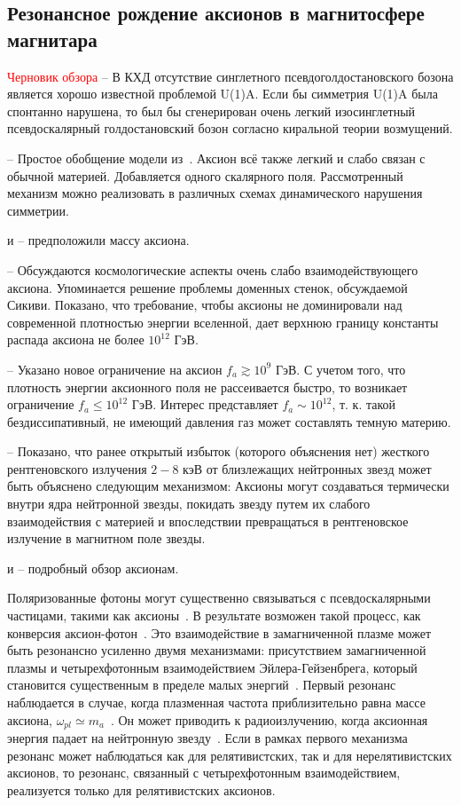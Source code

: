 \subsection{Резонансное рождение аксионов в магнитосфере магнитара}
\textcolor{red}{Черновик обзора}
\cite{Weinberg:1975} -- В КХД отсутствие синглетного псевдоголдостановского 
бозона является хорошо известной проблемой U(1)A. Если бы симметрия U(1)A была 
спонтанно нарушена, то был бы сгенерирован очень легкий изосинглетный 
псевдоскалярный голдостановский бозон согласно киральной теории возмущений.

\cite{Dine:1981} -- Простое обобщение модели из~\cite{Quinn:1977}. Аксион всё также легкий и слабо связан с обычной материей. Добавляется одного скалярного поля. Рассмотренный механизм можно реализовать в различных схемах динамического нарушения симметрии.

\cite{Weinberg:1978} и \cite{Wilczek:1978} -- предположили массу аксиона.

\cite{Dine:1983} -- Обсуждаются космологические аспекты очень слабо взаимодействующего аксиона. Упоминается решение проблемы доменных стенок, обсуждаемой Сикиви. Показано, что требование, чтобы аксионы не доминировали над современной плотностью энергии вселенной, дает верхнюю границу константы распада аксиона не более $10^{12}$ ГэВ.

\cite{Preskill:1983} -- Указано новое ограничение на аксион $f_a\gtrsim 10^9$ ГэВ. С учетом того, что плотность энергии аксионного поля не рассеивается быстро, то возникает ограничение $f_a\leqslant10^{12}$ ГэВ. Интерес представляет $f_a\sim 10^{12}$, т. к. такой бездиссипативный, не имеющий давления газ может составлять темную материю.

\cite{Buschmann:2021} -- Показано, что ранее открытый избыток (которого объяснения нет) жесткого рентгеновского излучения $2-8$ кэВ от близлежащих нейтронных звезд может быть объяснено следующим механизмом: Аксионы могут создаваться термически внутри ядра нейтронной звезды, покидать звезду путем их слабого взаимодействия с материей и впоследствии превращаться в рентгеновское излучение в магнитном поле звезды.

\cite{Kim:2010} и \cite{Marsh:2016} -- подробный обзор аксионам.

Поляризованные фотоны могут существенно связываться с псевдоскалярными частицами, такими как аксионы~\cite{Sikivie:1983}. В результате возможен такой процесс, как конверсия аксион-фотон~\cite{Raffelt:1988}. Это взаимодействие в замагниченной плазме может быть резонансно усиленно двумя механизмами: присутствием замагниченной плазмы и четырехфотонным взаимодействием Эйлера-Гейзенбрега, который становится существенным в пределе малых энергий~\cite{Lai:2006}. Первый резонанс наблюдается в случае, когда плазменная частота приблизительно равна массе аксиона, $\omega_{pl}\simeq m_a$~\cite{Yanagida:1988}. Он может приводить к радиоизлучению, когда аксионная энергия падает на нейтронную звезду~\cite{Pshirkov:2009}. Если в рамках первого механизма резонанс может наблюдаться как для релятивистских, так и для нерелятивистских аксионов, то резонанс, связанный с четырехфотонным взаимодействием, реализуется только для релятивистских аксионов.

